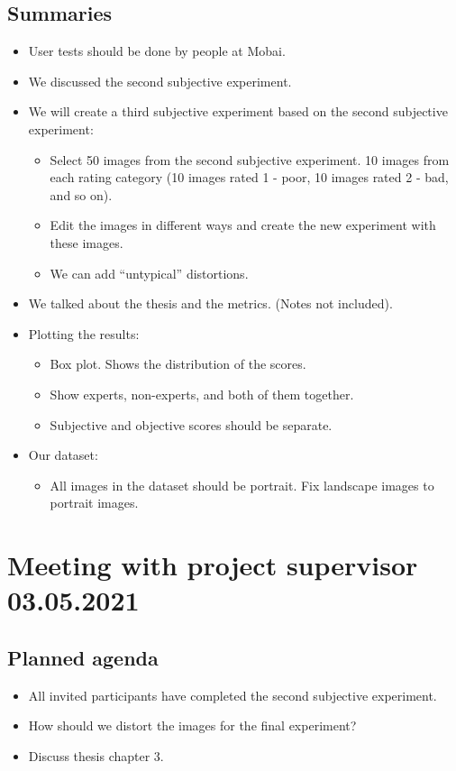 \subsection*{Summaries}
\begin{itemize}
    \item User tests should be done by people at Mobai.
    \item We discussed the second subjective experiment. 
    \item We will create a third subjective experiment based on the second subjective experiment:
    \begin{itemize}
        \item Select 50 images from the second subjective experiment. 10 images from each rating category (10 images rated 1 - poor, 10 images rated 2 - bad, and so on).
        \item Edit the images in different ways and create the new experiment with these images.
        \item We can add “untypical” distortions.
    \end{itemize}
    \item We talked about the thesis and the metrics. (Notes not included).
    \item Plotting the results:
    \begin{itemize}
        \item Box plot. Shows the distribution of the scores.
        \item Show experts, non-experts, and both of them together.
        \item Subjective and objective scores should be separate.
    \end{itemize}
    \item Our dataset:
    \begin{itemize}
        \item All images in the dataset should be portrait. Fix landscape images to portrait images. 
    \end{itemize}
\end{itemize}

\newpage

\section*{Meeting with project supervisor 03.05.2021}
\subsection*{Planned agenda}
\begin{itemize}
    \item All invited participants have completed the second subjective experiment.
    \item How should we distort the images for the final experiment?
    \item Discuss thesis chapter 3.
\end{itemize}

